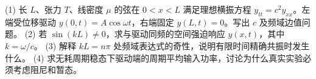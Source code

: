 (1) 长 \(L\)、张力 \(T\)、线密度 \(\mu\) 的弦在 \(0<x<L\) 满足理想横振方程 \(y_{tt}=c^2y_{xx}\)。左端受位移驱动 \(y(0,t)=A\cos\omega t\)，右端固定 \(y(L,t)=0\)。写出 \(c\) 及频域边值问题。
(2) 若 \(\sin(kL)\ne0\)，求与驱动同频的空间强迫响应 \(y(x,t)\)，其中 \(k=\omega/c\)。
(3) 解释 \(kL=n\pi\) 处频域表达式的奇性，说明有限时间精确共振时发生什么。
(4) 求无耗周期稳态下驱动端的周期平均输入功率，讨论为什么真实实验必须考虑阻尼和暂态。
